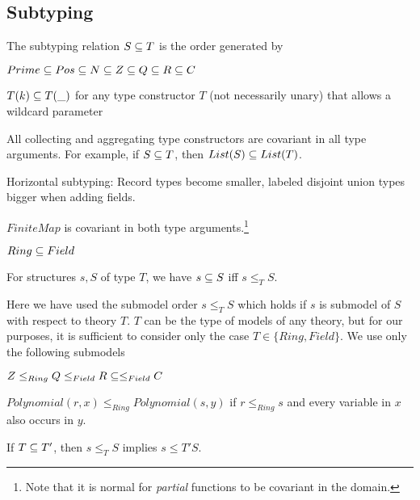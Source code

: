 \subsection{Subtyping}

The subtyping relation $S\sq T$ is the order generated by
\begin{compactitem}
 \item $Prime\sq Pos\sq N\sq Z\sq Q\sq R\sq C$
 \item $T(k)\sq T(\_)$ for any type constructor $T$ (not necessarily unary) that allows a wildcard parameter
 \item All collecting and aggregating type constructors are covariant in all type arguments. For example, if $S\sq T$, then $List(S)\sq List(T)$.
 \item Horizontal subtyping: Record types become smaller, labeled disjoint union types bigger when adding fields.
 \item $FiniteMap$ is covariant in both type arguments.\footnote{Note that it is normal for \emph{partial} functions to be covariant in the domain.}
 \item $Ring\sq Field$
 \item For structures $s,S$ of type $T$, we have $s\sq S$ iff $s\leq_T S$. 
\end{compactitem}

Here we have used the submodel order $s\leq_T S$ which holds if $s$ is submodel of $S$ with respect to theory $T$.
$T$ can be the type of models of any theory, but for our purposes, it is sufficient to consider only the case $T\in\{Ring,Field\}$.
We use only the following submodels
\begin{compactitem}
 \item $Z\leq_{Ring} Q\leq_{Field} R\sq\leq_{Field} C$
 \item $Polynomial(r,x)\leq_{Ring} Polynomial(s,y)$ if $r\leq_{Ring} s$ and every variable in $x$ also occurs in $y$.
 \item If $T\sq T'$, then $s\leq_T S$ implies $s\leq{T'}S$.
\end{compactitem}
